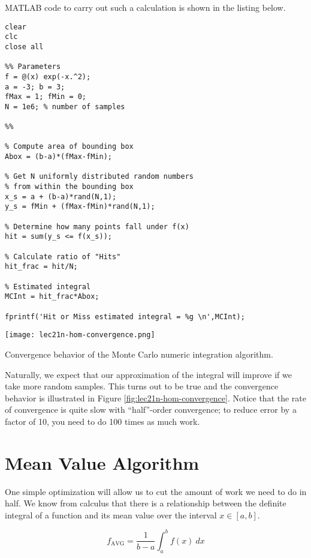 MATLAB code to carry out such a calculation is shown in the listing below.

\begin{lstlisting}[style=myMatlab,name=lec21-ex1]
clear
clc
close all

%% Parameters
f = @(x) exp(-x.^2);
a = -3; b = 3;
fMax = 1; fMin = 0;
N = 1e6; % number of samples

%%

% Compute area of bounding box
Abox = (b-a)*(fMax-fMin); 

% Get N uniformly distributed random numbers
% from within the bounding box
x_s = a + (b-a)*rand(N,1);
y_s = fMin + (fMax-fMin)*rand(N,1);

% Determine how many points fall under f(x)
hit = sum(y_s <= f(x_s));

% Calculate ratio of "Hits"
hit_frac = hit/N;

% Estimated integral
MCInt = hit_frac*Abox;

fprintf('Hit or Miss estimated integral = %g \n',MCInt);
\end{lstlisting}

\begin{marginfigure}
\texttt{[image: lec21n-hom-convergence.png]}
\caption{Convergence behavior of the Monte Carlo numeric integration algorithm.}
\label{fig:lec21n-hom-convergence}
\end{marginfigure}

Naturally, we expect that our approximation of the integral will improve if we take more random samples.  This turns out to be true and the convergence behavior is illustrated in Figure \ref{fig:lec21n-hom-convergence}.  Notice that the rate of convergence is quite slow with ``half''-order convergence; to reduce error by a factor of 10, you need to do 100 times as much work. 

\section{Mean Value Algorithm}
One simple optimization will allow us to cut the amount of work we need to do in half.  We know from calculus that there is a relationship between the definite integral of a function and its mean value over the interval $x \in [a,b]$.

\begin{equation}
f_{\text{AVG}} = \frac{1}{b-a}\int_{a}^{b} f(x) \ dx
\label{eq:lec21n-mean-value-thm}
\end{equation}

